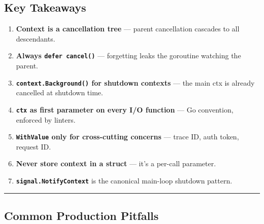 \documentclass[11pt,a4paper,oneside]{book}
\providecommand{\tightlist}{\setlength{\itemsep}{0pt}\setlength{\parskip}{0pt}}
\begin{document}
\subsection{Key Takeaways}

\begin{enumerate}
\def\labelenumi{\arabic{enumi}.}
\tightlist
\item
  \textbf{Context is a cancellation tree} --- parent cancellation
  cascades to all descendants.
\item
  \textbf{Always \texttt{defer\ cancel()}} --- forgetting leaks the
  goroutine watching the parent.
\item
  \textbf{\texttt{context.Background()} for shutdown contexts} --- the
  main ctx is already cancelled at shutdown time.
\item
  \textbf{\texttt{ctx} as first parameter on every I/O function} --- Go
  convention, enforced by linters.
\item
  \textbf{\texttt{WithValue} only for cross-cutting concerns} --- trace
  ID, auth token, request ID.
\item
  \textbf{Never store context in a struct} --- it's a per-call
  parameter.
\item
  \textbf{\texttt{signal.NotifyContext}} is the canonical main-loop
  shutdown pattern.
\end{enumerate}

\begin{center}\rule{0.5\linewidth}{0.5pt}\end{center}

\subsection{Common Production
Pitfalls}
\end{document}

